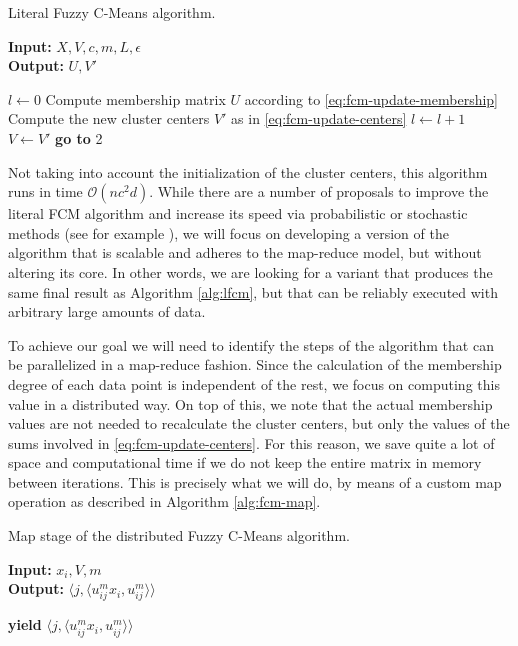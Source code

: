 \begin{algorithm}
  \caption{Literal Fuzzy C-Means algorithm.}
    \label{alg:lfcm}
    \textbf{Input:} $X,V,c,m,L, \epsilon$\\
    \textbf{Output:} $U,V'$
  \begin{algorithmic}[1]
    \State $l \gets 0$
    \State Compute membership matrix $U$ according to \eqref{eq:fcm-update-membership}
    \State Compute the new cluster centers $V'$ as in \eqref{eq:fcm-update-centers}
    \State $l \gets l+1$
     
      \State {}
    \Else
      \State $V \gets V'$
      \State \textbf{go to} 2
    \EndIf
  \end{algorithmic}
\end{algorithm}

Not taking into account the initialization of the cluster centers, this algorithm runs in time $\mathcal O(nc^2d)$. While there are a number of proposals to improve the literal FCM algorithm and increase its speed via probabilistic or stochastic methods (see for example \cite{pham2001probabilistic}), we will focus on developing a version of the algorithm that is scalable and adheres to the map-reduce model, but without altering its core. In other words, we are looking for a variant that produces the same final result as Algorithm \ref{alg:lfcm}, but that can be reliably executed with arbitrary large amounts of data.

To achieve our goal we will need to identify the steps of the algorithm that can be parallelized in a map-reduce fashion. Since the calculation of the membership degree of each data point is independent of the rest, we focus on computing this value in a distributed way. On top of this, we note that the actual membership values are not needed to recalculate the cluster centers, but only the values of the sums involved in \eqref{eq:fcm-update-centers}. For this reason, we save quite a lot of space and computational time if we do not keep the entire matrix in memory between iterations. This is precisely what we will do, by means of a custom map operation as described in Algorithm \ref{alg:fcm-map}.

\begin{algorithm}
  \caption{Map stage of the distributed Fuzzy C-Means algorithm.}
    \label{alg:fcm-map}
    \textbf{Input:} $x_i,V,m$\\
    \textbf{Output:} $\langle j, \langle u_{ij}^m x_i, u_{ij}^m \rangle \rangle$
  \begin{algorithmic}[1]
      \State \textbf{yield} $\langle j, \langle u_{ij}^m x_i, u_{ij}^m \rangle \rangle$ 
    \EndFor
  \end{algorithmic}
\end{algorithm}

